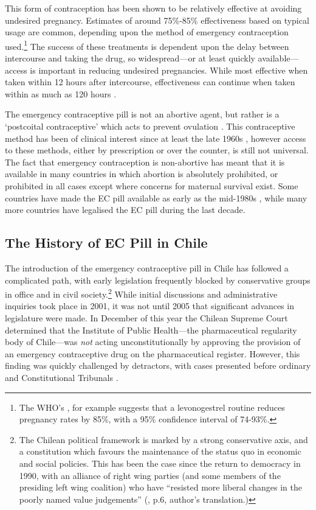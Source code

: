 This form of contraception has been shown to be relatively effective at 
avoiding undesired pregnancy.  Estimates of around 75\%-85\% effectiveness 
based on typical usage are common, depending upon the method of emergency 
contraception used.\footnote{The WHO's \citet{WHO1998}, for example suggests 
that a levonogestrel routine reduces pregnancy rates by 85\%, with a 95\% 
confidence interval of 74-93\%.}  The success of these treatments is dependent
upon the delay between intercourse and taking the drug, so widespread---or at 
least quickly available---access is important in reducing undesired pregnancies.
While most effective when taken within 12 hours after intercourse, 
effectiveness can continue when taken within as much as 120 hours
\citep{vonHertzenetal2002}.

The emergency contraceptive pill is not an abortive agent, but rather is a 
`postcoital contraceptive' which acts to prevent ovulation 
\citep{Novikovaetal2007, Noeetal2011}. This contraceptive method has been of 
clinical interest since at least the late 1960s \citep{Demers1971}, however 
access to these methods, either by prescription or over the counter, is still 
not universal.  The fact that emergency contraception is non-abortive has 
meant that it is available in many countries in which abortion is absolutely 
prohibited, or prohibited in all cases except where concerns for maternal 
survival exist.  Some countries have made the EC pill available as early as 
the mid-1980s \citep{UKFPA2006}, while many more countries have legalised 
the EC pill during the last decade.

\subsection{The History of EC Pill in Chile}
\label{TEENsscn:Chile}
The introduction of the emergency contraceptive pill in Chile has followed 
a complicated path, with early legislation frequently blocked by conservative 
groups in office and in civil society.\footnote{The Chilean political 
framework is marked by a strong conservative axis, and a constitution which 
favours the maintenance of the status quo in economic and social policies.  
This has been the case since the return to democracy in 1990, with an 
alliance of right wing parties (and some members of the presiding left wing 
coalition) who have ``resisted more liberal changes in the poorly named value 
judgements''  (\citet{CasasBecerra2008}, p.6, author's translation.)}  While 
initial discussions and administrative inquiries took place in 2001, it was 
not until 2005 that significant advances in legislature were made. In 
December of this year the Chilean Supreme Court determined that the Institute 
of Public Health---the pharmaceutical regularity body of Chile---was 
\emph{not} acting unconstitutionally by approving the provision of an 
emergency contraceptive drug on the pharmaceutical register.  However, this 
finding was quickly challenged by detractors, with cases presented before 
ordinary and Constitutional Tribunals \citep{CasasBecerra2008}.

